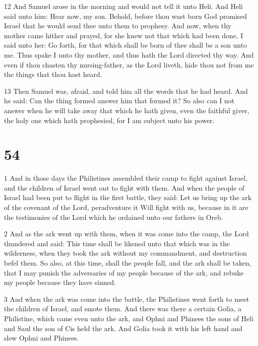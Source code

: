 \par 12 And Samuel arose in the morning and would not tell it unto Heli. And Heli said unto him: Hear now, my son. Behold, before thou wast born God promised Israel that he would send thee unto them to prophesy. And now, when thy mother came hither and prayed, for she knew not that which had been done, I said unto her: Go forth, for that which shall be born of thee shall be a son unto me. Thus spake I unto thy mother, and thus hath the Lord directed thy way. And even if thou chasten thy nursing-father, as the Lord liveth, hide thou not from me the things that thou hast heard. 

\par 13 Then Samuel was, afraid, and told him all the words that he had heard. And he said: Can the thing formed answer him that formed it? So also can I not answer when he will take away that which he hath given, even the faithful giver, the holy one which hath prophesied, for I am subject unto his power.



\chapter{54}

\par 1 And in those days the Philistines assembled their camp to fight against Israel, and the children of Israel went out to fight with them. And when the people of Israel had been put to flight in the first battle, they said: Let us bring up the ark of the covenant of the Lord, peradventure it Will fight with us, because in it are the testimonies of the Lord which he ordained unto our fathers in Oreb. 

\par 2 And as the ark went up with them, when it was come into the camp, the Lord thundered and said: This time shall be likened unto that which was in the wilderness, when they took the ark without my commandment, and destruction befel them. So also, at this time, shall the people fall, and the ark shall be taken, that I may punish the adversaries of my people because of the ark, and rebuke my people because they have sinned.

\par 3 And when the ark was come into the battle, the Philistines went forth to meet the children of Israel, and smote them. And there was there a certain Golia, a Philistine, which came even unto the ark, and Ophni and Phinees the sons of Heli and Saul the son of Cis held the ark. And Golia took it with his left hand and slew Ophni and Phinees. 

